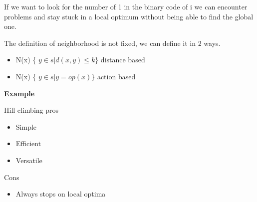 \vspace{10pt}

If we want to look for the number of 1 in the binary code of i we can encounter problems and stay stuck in a local optimum without being able to find the global one. 
\vspace{10pt}

The definition of neighborhood is not fixed, we can define it in 2 ways.

\begin{itemize}
    \item N(x) \ra \{ $y \in s | d(x,y) \le k \}$ \ra distance based
    \item N(x) \ra \{ $y \in s | y = op(x) \}$ \ra action based
\end{itemize}


\begin{center}
\textbf{Example}
\end{center}


Hill climbing pros

\begin{itemize}
    \item Simple
    \item Efficient
    \item Versatile
\end{itemize}

Cons
\begin{itemize}
    \item Always stops on local optima
\end{itemize}

